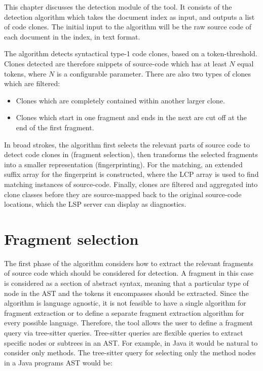 This chapter discusses the detection module of the tool. It consists of the detection
algorithm which takes the document index as input, and outputs a list of code clones. The
initial input to the algorithm will be the raw source code of each document in the index,
in text format.

The algorithm detects syntactical type-1 code clones, based on a token-threshold. Clones
detected are therefore snippets of source-code which has at least $N$ equal tokens, where
$N$ is a configurable parameter. There are also two types of clones which are filtered:

\begin{itemize}
    \item Clones which are completely contained within another larger clone.
    \item Clones which start in one fragment and ends in the next are cut off at the end
        of the first fragment.
\end{itemize}


In broad strokes, the algorithm first selects the relevant parts of source code to detect
code clones in (fragment selection), then transforms the selected fragments into a smaller
representation (fingerprinting). For the matching, an extended suffix array for the fingerprint
is constructed, where the LCP array is used to find matching instances of source-code.
Finally, clones are filtered and aggregated into clone classes before they are
source-mapped back to the original source-code locations, which the LSP server can display
as diagnostics.

\section{Fragment selection}

The first phase of the algorithm considers how to extract the relevant fragments of source
code which should be considered for detection. A fragment in this case is considered as a
section of abstract syntax, meaning that a particular type of node in the AST and the
tokens it encompasses should be extracted. Since the algorithm is language agnostic, it is
not feasible to have a single algorithm for fragment extraction or to define a separate
fragment extraction algorithm for every possible language. Therefore, the tool allows the
user to define a fragment query via tree-sitter queries\cite{treesitter}. Tree-sitter
queries are flexible queries to extract specific nodes or subtrees in an AST. For example,
in Java it would be natural to consider only methods. The tree-sitter query for selecting
only the method nodes in a Java programs AST would be:


